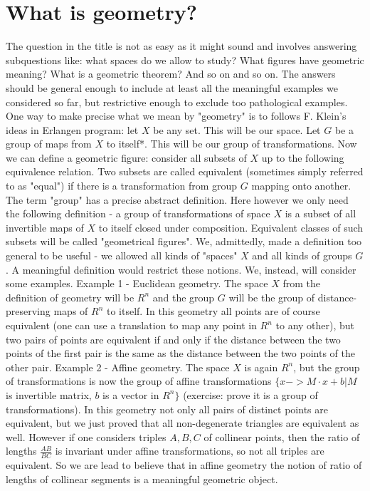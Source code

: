 \section{What is geometry?}
The question in the title is not as easy as it might sound and involves answering subquestions like: what spaces do we allow to study? What figures have geometric meaning? What is a geometric theorem? And so on and so on. The answers should be general enough to include at least all the meaningful examples we considered so far, but restrictive enough to exclude too pathological examples. One way to make precise what we mean by "geometry" is to follows F. Klein's ideas in Erlangen program: let $X$ be any set. This will be our space. Let $G$ be a group of maps from $X$ to itself*. This will be our group of transformations. Now we can define a geometric figure: consider all subsets of $X$ up to the following equivalence relation. Two subsets are called equivalent (sometimes simply referred to as "equal") if there is a transformation from group $G$ mapping onto another.
The term "group" has a precise abstract definition. Here however we only need the following definition - a group of transformations of space $X$ is a subset of all invertible maps of $X$ to itself closed under composition.
Equivalent classes of such subsets will be called "geometrical figures".
We, admittedly, made a definition too general to be useful - we allowed all kinds of "spaces" $X$ and all kinds of groups $G$. A meaningful definition would restrict these notions. We, instead, will consider some examples.
Example 1 - Euclidean geometry. The space $X$ from the definition of geometry will be $R^n$ and the group $G$ will be the group of distance-preserving maps of $R^n$ to itself. In this geometry all points are of course equivalent (one can use a translation to map any point in $R^n$ to any other), but two pairs of points are equivalent if and only if the distance between the two points of the first pair is the same as the distance between the two points of the other pair.
Example 2 - Affine geometry. The space $X$ is again $R^n$, but the group of transformations is now the group of affine transformations $\{x->M\cdot x + b|M$ is invertible matrix, $b$ is a vector in $R^n\}$ (exercise: prove it is a group of transformations). In this geometry not only all pairs of distinct points are equivalent, but we just proved that all non-degenerate triangles are equivalent as well. However if one considers triples $A,B,C$ of collinear points, then the ratio of lengths $\frac{AB}{BC}$ is invariant under affine transformations, so not all triples are equivalent. So we are lead to believe that in affine geometry the notion of ratio of lengths of collinear segments is a meaningful geometric object.
